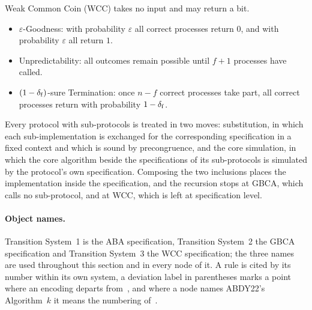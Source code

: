 Weak Common Coin (WCC) takes no input and may return a bit.
\begin{itemize}
  \item $\varepsilon$-Goodness: with probability $\varepsilon$ all correct processes return $0$, and with probability $\varepsilon$ all return $1$.
  \item Unpredictability: all outcomes remain possible until $f+1$ processes have called.
  \item $(1-\delta_{\mathrm{f}})$-sure Termination: once $n-f$ correct processes take part, all correct processes return with probability $1-\delta_{\mathrm{f}}$.
\end{itemize}

Every protocol with sub-protocols is treated in two moves: substitution, in which each sub-implementation is exchanged for the corresponding specification in a fixed context and which is sound by precongruence, and the core simulation, in which the core algorithm beside the specifications of its sub-protocols is simulated by the protocol's own specification.
Composing the two inclusions places the implementation inside the specification, and the recursion stops at GBCA, which calls no sub-protocol, and at WCC, which is left at specification level.

\paragraph{Object names.}
Transition System~1 is the ABA specification, Transition System~2 the GBCA specification and Transition System~3 the WCC specification; the three names are used throughout this section and in every node of it.
A rule is cited by its number within its own system, a deviation label in parentheses marks a point where an encoding departs from~\cite{LeslieBP}, and where a node names ABDY22's Algorithm~$k$ it means the numbering of~\cite{ABDY22}.

